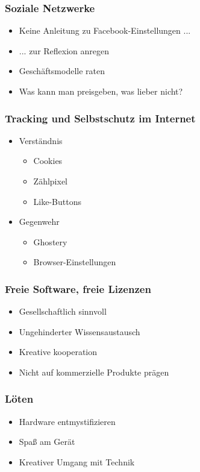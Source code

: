 \documentclass[12pt]{beamer}
\begin{document}
\begin{frame}
  \frametitle{Soziale Netzwerke}
  \begin{itemize}
    \item<2-> Keine Anleitung zu Facebook-Einstellungen ...
    \item<3-> ... zur Reflexion anregen
    \item<4-> Geschäftsmodelle raten
    \item<5-> Was kann man preisgeben, was lieber nicht?
  \end{itemize}
\end{frame}

\begin{frame}
  \frametitle{Tracking und Selbstschutz im Internet}
  \begin{itemize}
    \item<2-> Verständnis
    \begin{itemize}
      \item Cookies
      \item Zählpixel
      \item Like-Buttons
    \end{itemize}
    \item<3-> Gegenwehr
    \begin{itemize}
      \item Ghostery
      \item Browser-Einstellungen
    \end{itemize}
  \end{itemize}
\end{frame}

\begin{frame}
  \frametitle{Freie Software, freie Lizenzen}
  \begin{itemize}
    \item<2-> Gesellschaftlich sinnvoll
    \item<3-> Ungehinderter Wissensaustausch
    \item<4-> Kreative kooperation
    \item<5-> Nicht auf kommerzielle Produkte prägen
  \end{itemize}
\end{frame}

\begin{frame}
  \frametitle{Löten}
  \begin{itemize}
    \item<2-> Hardware entmystifizieren
    \item<3-> Spaß am Gerät
    \item<4-> Kreativer Umgang mit Technik
  \end{itemize}
\end{frame}
\end{document}
